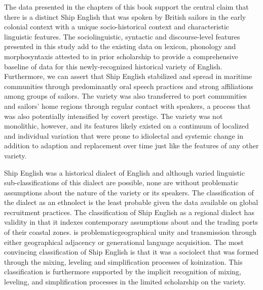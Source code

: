 \begin{styleStandard}
The data presented in the chapters of this book support the central claim that there is a distinct Ship English that was spoken by British sailors in the early colonial context with a unique socio-historical context and characteristic linguistic features. The sociolinguistic, syntactic and discourse-level features presented in this study add to the existing data on lexicon, phonology and morphosyntaxis attested to in prior scholarship to provide a comprehensive baseline of data for this newly-recognized historical variety of English. Furthermore, we can assert that Ship English stabilized and spread in maritime communities through predominantly oral speech practices and strong affiliations among groups of sailors. The variety was also transferred to port communities and sailors’ home regions through regular contact with speakers, a process that was also potentially intensified by covert prestige. The variety was not monolithic, however, and its features likely existed on a continuum of localized and individual variation that were prone to idiolectal and systemic change in addition to adaption and replacement over time just like the features of any other variety. 
\end{styleStandard}

\begin{styleStandard}
Ship English was a historical dialect of English and although varied linguistic sub-classifications of this dialect are possible, none are without problematic assumptions about the nature of the variety or its speakers. The classification of the dialect as an ethnolect is the least probable given the data available on global recruitment practices. The classification of Ship English as a regional dialect has validity in that it indexes contemporary assumptions about  and the trading ports of their coastal zones. is problematicgeographical unity and transmission through either geographical adjacency or generational language acquisition. The most convincing classification of Ship English is that it was a sociolect that was formed through the mixing, leveling and simplification processes of koinization. This classification is furthermore supported by the implicit recognition of mixing, leveling, and simplification processes in the limited scholarship on the variety.
\end{styleStandard}


